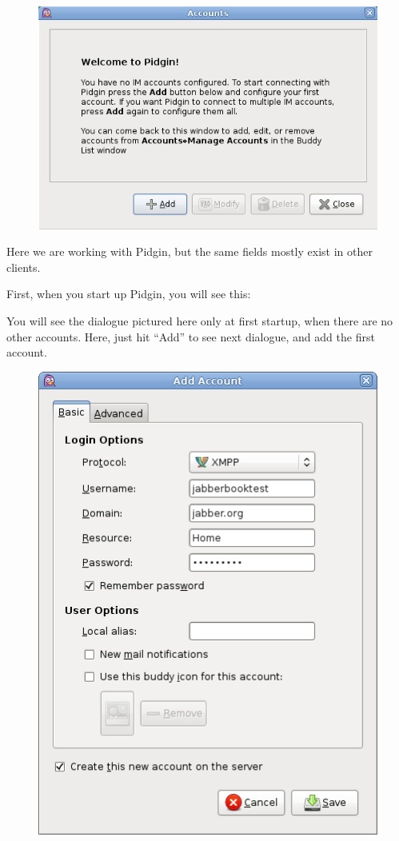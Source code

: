 \begin{figure}
    \includegraphics[scale=0.40]{./media/jabber_pidgin_accounts}
\end{figure}

Here we are working with Pidgin, but  the same f\hbox{}ields mostly exist in
other clients.

F\hbox{}irst, when you start up Pidgin, you will see this:

You will see the dialogue pictured here only at f\hbox{}irst startup, when there
are no other accounts. Here, just hit ``Add'' to see next dialogue, and add the
f\hbox{}irst account.

\begin{figure}
    \includegraphics[scale=0.40]{./media/jabber_pidgin_add_account}
\end{figure}

